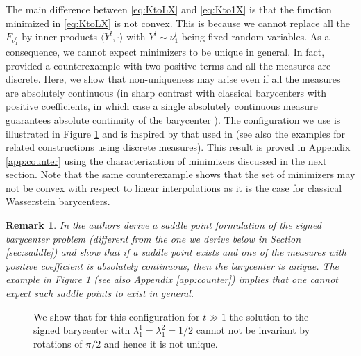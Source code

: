 \documentclass[12pt]{amsart}
\numberwithin{equation}{section}
\theoremstyle{plain}
\newtheorem{remark}[theorem]{Remark}
\theoremstyle{definition}
\begin{document}
The main difference between \eqref{eq:KtoLX} and \eqref{eq:Kto1X} is that the function minimized in \eqref{eq:KtoLX} is not convex. This is because we cannot replace all the $F_{\nu_1^l}$ by inner products $\langle Y^l,\cdot\rangle $ with $Y^l\sim \nu_1^l$ being fixed random variables. 
As a consequence, we cannot expect minimizers to be unique in general. In fact, \cite{tornabene2024generalized} provided a counterexample with two positive terms and all the measures are discrete. Here, we show that non-uniqueness may arise even if all the measures are absolutely continuous (in sharp contrast with classical barycenters with positive coefficients, in which case a single absolutely continuous measure guarantees absolute continuity of the barycenter \cite{agueh2011barycenters}). The configuration we use is illustrated in Figure \ref{fig:nonunique} and is inspired by that used in \cite{tornabene2024generalized} (see also the examples \cite{bolbotowski2025bi} for  related constructions using discrete measures). This result is proved in Appendix \ref{app:counter} using the characterization of minimizers discussed in the next section.  Note that the same counterexample shows that the set of minimizers may not be convex with respect to linear interpolations as it is the case for classical Wasserstein barycenters.

\begin{remark} In \cite{jacobs2026signed} the authors derive a saddle point formulation of the signed barycenter problem (different from the one we derive below in Section \ref{sec:saddle}) and show that if a saddle point exists and one of the measures with positive coefficient is absolutely continuous, then the barycenter is unique. The example in Figure \ref{fig:nonunique} (see also Appendix \ref{app:counter}) implies that one cannot expect such saddle points to exist in general.    
\end{remark}

\begin{figure}
\caption{We show that for
this configuration for $t\gg 1$ the solution to the signed barycenter with $\lambda_1^1=\lambda_1^2 = 1/2$ cannot not be invariant by rotations of $\pi/2$ and hence it is not unique.
}\label{fig:nonunique}
\end{figure}
\end{document}
